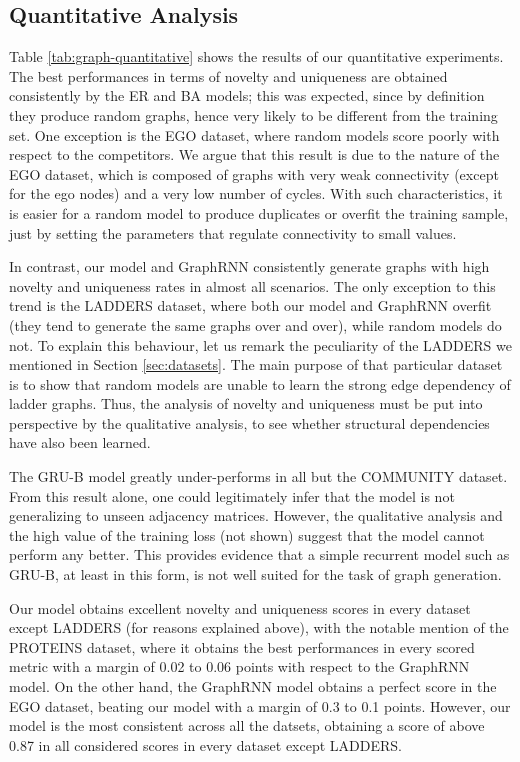 \subsection{Quantitative Analysis}
Table \ref{tab:graph-quantitative} shows the results of our quantitative experiments. The best performances in terms of novelty and uniqueness are obtained consistently by the ER and BA models; this was expected, since by definition they produce random graphs, hence very likely to be different from the training set. One exception is the EGO dataset, where random models score poorly with respect to the competitors. We argue that this result is due to the nature of the EGO dataset, which is composed of graphs with very weak connectivity (except for the ego nodes) and a very low number of cycles. With such characteristics, it is easier for a random model to produce duplicates or overfit the training sample, just by setting the parameters that regulate connectivity to small values.

In contrast, our model and GraphRNN consistently generate graphs with high novelty and uniqueness rates in almost all scenarios. The only exception to this trend is the LADDERS dataset, where both our model and GraphRNN overfit (they tend to generate the same graphs over and over), while random models do not. To explain this behaviour, let us remark the peculiarity of the LADDERS we mentioned in Section \ref{sec:datasets}. The main purpose of that particular dataset is to show that random models are unable to learn the strong edge dependency of ladder graphs. Thus, the analysis of novelty and uniqueness must be put into perspective by the qualitative analysis, to see whether structural dependencies have also been learned.

The GRU-B model greatly under-performs in all but the COMMUNITY dataset. From this result alone, one could legitimately infer that the model is not generalizing to unseen adjacency matrices. However, the qualitative analysis and the high value of the training loss (not shown) suggest that the model cannot perform any better. This provides evidence that a simple recurrent model such as GRU-B, at least in this form, is not well suited for the task of graph generation.

Our model obtains excellent novelty and uniqueness scores in every dataset except LADDERS (for reasons explained above), with the notable mention of the PROTEINS dataset, where it obtains the best performances in every scored metric with a margin of 0.02 to 0.06 points with respect to the GraphRNN model. On the other hand, the GraphRNN model obtains a perfect score in the EGO dataset, beating our model with a margin of 0.3 to 0.1 points. However, our model is the most consistent across all the datsets, obtaining a score of above 0.87 in all considered scores in every dataset except LADDERS.

